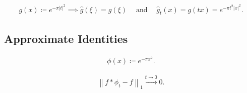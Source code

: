 \begin{proposition}

\begin{align*}
g(x) \coloneqq e^{-\pi {\left\lvert {t} \right\rvert}^2} \implies \widehat{g}(\xi) = g(\xi) {\quad \operatorname{and} \quad}
\widehat{g}_{t}(x) = g(tx) = e^{-\pi t^2 {\left\lvert {x} \right\rvert}^2}
.\end{align*}

\end{proposition}

\hypertarget{approximate-identities}{%
\subsection{Approximate Identities}\label{approximate-identities}}

\begin{example}

\begin{align*}
\phi(x) \coloneqq e^{-\pi x^2}
.\end{align*}

\end{example}

\begin{theorem}

\begin{align*}
{\left\lVert {f \ast \phi_{t} - f} \right\rVert}_{1} \overset{t\to 0}\to 0
.\end{align*}

\end{theorem}

